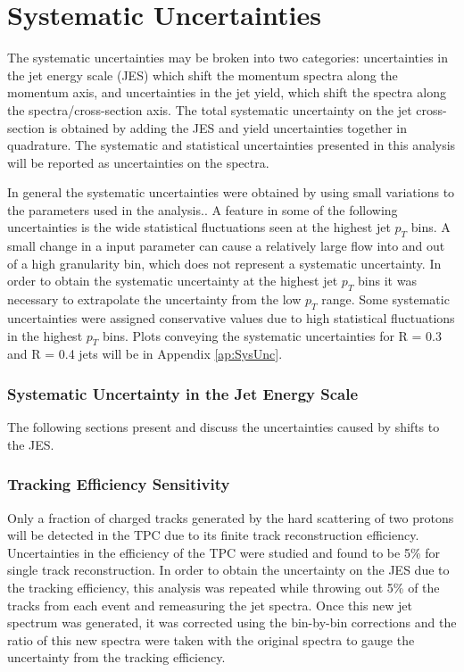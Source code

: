 \section{Systematic Uncertainties}

The systematic uncertainties may be broken into two categories: uncertainties in the jet energy scale (JES) which shift the momentum spectra along the momentum axis, and uncertainties in the jet yield, which shift the spectra along the spectra/cross-section axis.  The total systematic uncertainty on the jet cross-section is obtained by adding the JES and yield uncertainties together in quadrature.  The systematic and statistical uncertainties presented in this analysis will be reported as uncertainties on the spectra.  

In general the systematic uncertainties were obtained by using small variations to the parameters used in the analysis..  A feature in some of the following uncertainties is the wide statistical fluctuations seen at the highest jet $p_{T}$ bins.  A small change in a input parameter can cause a relatively large flow into and out of a high granularity bin, which does not represent a systematic uncertainty.  In order to obtain the systematic uncertainty at the highest jet $p_{T}$ bins it was necessary to extrapolate the uncertainty from the low $p_{T}$ range.  Some systematic uncertainties were assigned conservative values due to high statistical fluctuations in the highest $p_{T}$ bins.  Plots conveying the systematic uncertainties for R = 0.3 and R = 0.4 jets will be in Appendix \ref{ap:SysUnc}.

\subsubsection{Systematic Uncertainty in the Jet Energy Scale}

The following sections present and discuss the uncertainties caused by shifts to the JES. 

\subsubsection{Tracking Efficiency Sensitivity}
Only a fraction of charged tracks generated by the hard scattering of two protons will be detected in the TPC due to its finite track reconstruction efficiency.  Uncertainties in the efficiency of the TPC were studied and found to be 5\% for single track reconstruction\cite{Abelev:2013ala}.  In order to obtain the uncertainty on the JES due to the tracking efficiency, this analysis was repeated while throwing out 5\% of the tracks from each event and remeasuring the jet spectra.  Once this new jet spectrum was generated, it was corrected using the bin-by-bin corrections and the ratio of this new spectra were taken with the original spectra to gauge the uncertainty from the tracking efficiency.


